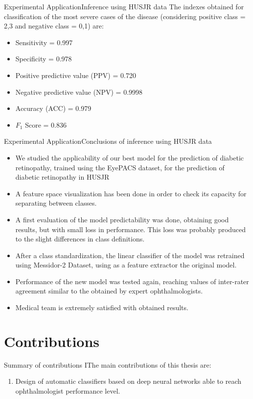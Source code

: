 \documentclass{beamer}
\begin{document}
\begin{frame}{Experimental Application}{Inference using HUSJR data}
The indexes obtained for classification of the most severe cases of the disease (considering positive class = 2,3 and negative class = 0,1) are:
\begin{itemize}
	\item Sensitivity = 0.997
	\item Specificity = 0.978
	\item Positive predictive value (PPV) = 0.720
	\item Negative predictive value (NPV) = 0.9998
	\item Accuracy (ACC) = 0.979
	\item $F_1$ Score = 0.836
\end{itemize}
\end{frame}

\begin{frame}{Experimental Application}{Conclusions of inference using HUSJR data}
\begin{itemize}
	\item We studied the applicability of our best model for the prediction of diabetic retinopathy, trained using the EyePACS dataset, for the prediction of diabetic retinopathy in HUSJR
	\item A feature space visualization has been done in order to check its capacity for separating between classes.
	\item A first evaluation of the model predictability was done, obtaining good results, but with small loss in performance. This loss was probably produced to the slight differences in class definitions.
	\item After a class standardization, the linear classifier of the model was retrained using Messidor-2 Dataset, using as a feature extractor the original model.
	\item  Performance of the new model was tested again, reaching values of inter-rater agreement similar to the obtained by expert ophthalmologists.
	\item Medical team is extremely satisfied with obtained results.
\end{itemize}
\end{frame}

\section{Contributions}

\begin{frame}{Summary of contributions I}{The main contributions of this thesis are:}

\begin{enumerate}
	\item Design of automatic classifiers based on deep neural networks able to reach ophthalmologist performance level.
	
	
\end{enumerate}
\end{frame}
\end{document}
